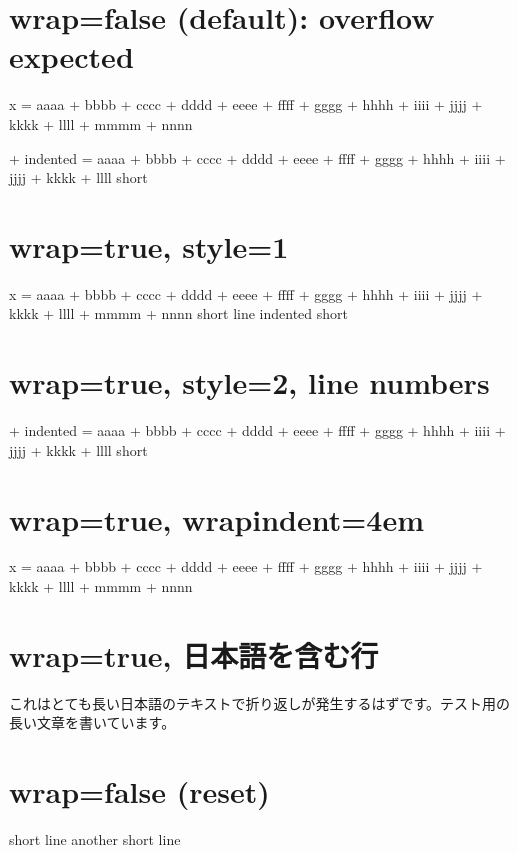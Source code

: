 \documentclass{ltjsarticle}
\begin{document}
\section*{wrap=false (default): overflow expected}

\KKcodeS
x = aaaa + bbbb + cccc + dddd + eeee + ffff + gggg + hhhh + iiii + jjjj + kkkk + llll + mmmm + nnnn
\KKcodeE

\KKcodeS+
  indented = aaaa + bbbb + cccc + dddd + eeee + ffff + gggg + hhhh + iiii + jjjj + kkkk + llll
  short
\KKcodeE

\section*{wrap=true, style=1}


\KKcodeS
x = aaaa + bbbb + cccc + dddd + eeee + ffff + gggg + hhhh + iiii + jjjj + kkkk + llll + mmmm + nnnn
short line
  indented short
\KKcodeE

\section*{wrap=true, style=2, line numbers}

\KKcodeS+
  indented = aaaa + bbbb + cccc + dddd + eeee + ffff + gggg + hhhh + iiii + jjjj + kkkk + llll
  short
\KKcodeE

\section*{wrap=true, wrapindent=4em}


\KKcodeS
x = aaaa + bbbb + cccc + dddd + eeee + ffff + gggg + hhhh + iiii + jjjj + kkkk + llll + mmmm + nnnn
\KKcodeE

\section*{wrap=true, 日本語を含む行}


\KKcodeS
これはとても長い日本語のテキストで折り返しが発生するはずです。テスト用の長い文章を書いています。
\KKcodeE

\section*{wrap=false (reset)}


\KKcodeS
short line
another short line
\KKcodeE
\end{document}
